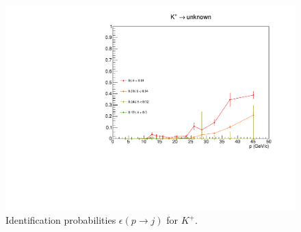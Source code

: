 \begin{figure}[!p]
  \includegraphics[scale=0.38]{./gfx/Kp_u.pdf}
	\caption{Identification probabilities $\epsilon(p \rightarrow j)$ for $K^+$.}
	\label{pic:Effpip}
\end{figure}

